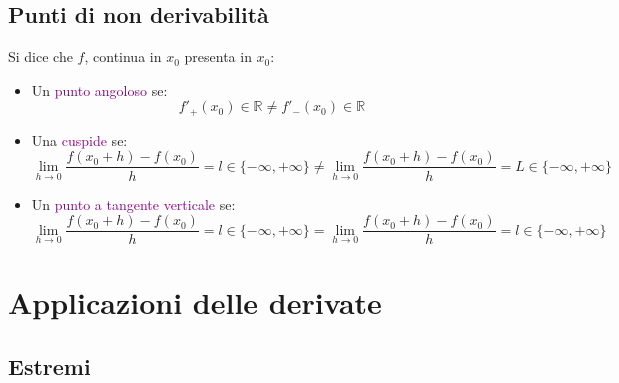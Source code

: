 \documentclass{article}
\begin{document}
\subsection{Punti di non derivabilità}

Si dice che $f$, continua in $x_0$ presenta in $x_0$: 

\begin{itemize}
    \item \begin{tcolorbox}[colback = pink!10!white,   colframe=red!50!blue]
    Un \textcolor{purple}{punto angoloso } se: 
    \[f'_+(x_0) \in \mathbb{R} \neq f'_-(x_0) \in \mathbb{R} \]
    \end{tcolorbox}
    \item \begin{tcolorbox}[colback = pink!10!white,   colframe=red!50!blue]
    Una \textcolor{purple}{cuspide} se: 
    \[\lim_{h \to 0}\frac{f(x_0 + h) -f(x_0)}{h} = l \in \{- \infty, + \infty\} \neq \lim_{h \to 0}\frac{f(x_0 + h) -f(x_0)}{h} = L \in \{- \infty, + \infty\} \]
    \end{tcolorbox}
     \item \begin{tcolorbox}[colback = pink!10!white,   colframe=red!50!blue]
    Un \textcolor{purple}{punto a tangente verticale} se: 
    \[\lim_{h \to 0}\frac{f(x_0 + h) -f(x_0)}{h} = l \in \{- \infty, + \infty\} = \lim_{h \to 0}\frac{f(x_0 + h) -f(x_0)}{h} = l \in \{- \infty, + \infty\} \]
    \end{tcolorbox}
\end{itemize}

\section{Applicazioni delle derivate}

\subsection{Estremi}
\end{document}
